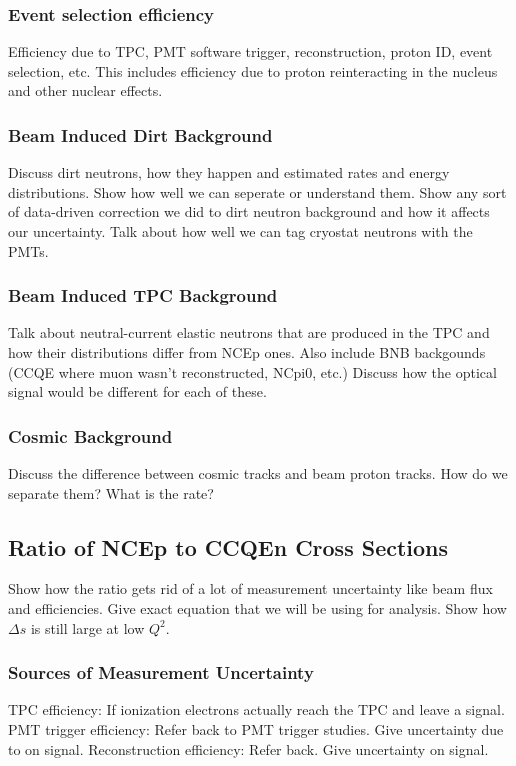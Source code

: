   \subsubsection{Event selection efficiency}
    Efficiency due to TPC, PMT software trigger, reconstruction, proton ID,
    event selection, etc. This includes efficiency due to proton reinteracting
    in the nucleus and other nuclear effects.
  \subsubsection{Beam Induced Dirt Background}
    Discuss dirt neutrons, how they happen and estimated rates and energy
    distributions.  Show how well we can seperate or understand them. Show any
    sort of data-driven correction we did to dirt neutron background and how it
    affects our uncertainty. Talk about how well we can tag cryostat neutrons
    with the PMTs.
  \subsubsection{Beam Induced TPC Background}
    Talk about neutral-current elastic neutrons that are produced in the TPC
    and how their distributions differ from NCEp ones. Also include BNB
    backgounds (CCQE where muon wasn't reconstructed, NCpi0, etc.) Discuss how
    the optical signal would be different for each of these.
  \subsubsection{Cosmic Background}
    Discuss the difference between cosmic tracks and beam proton tracks. How do
    we separate them? What is the rate?


\subsection{Ratio of NCEp to CCQEn Cross Sections}\label{sec:ratios}
  Show how the ratio gets rid of a lot of measurement uncertainty like beam
  flux and efficiencies. Give exact equation that we will be using for
  analysis. Show how $\Delta s$ is still large at low $Q^2$.
  \subsubsection{Sources of Measurement Uncertainty}
    TPC efficiency: If ionization electrons actually reach the
    TPC and leave a signal.
    PMT trigger efficiency: Refer back to PMT trigger studies. Give uncertainty
    due to on signal.
    Reconstruction efficiency: Refer back. Give uncertainty on signal.
